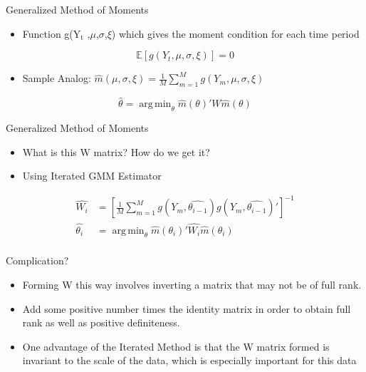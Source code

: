 \documentclass[bigger]{beamer}
\DeclareMathOperator*{\argmin}{arg\,min}
\begin{document}
\begin{frame}[label=sec-1-17]{Generalized Method of Moments}
\begin{itemize}
\item Function g(Y$_{\text{t}}$ ,$\mu$,$\sigma$,$\xi$) which gives the moment condition for
each time period
\end{itemize}
\begin{equation*}
\mathbb{E}[ g( Y_t, \mu, \sigma, \xi ) ] = 0
\end{equation*}
\begin{itemize}
\item Sample Analog: $\hat{m} ( \mu, \sigma, \xi ) = \frac{ 1 }{ M } \sum_{m=1}^M g( Y_m,
  \mu, \sigma, \xi )$
\end{itemize}

\begin{equation*}
\hat{\theta} = \argmin_{\theta} \hat{m}( \theta )' W \hat{m}( \theta )
\end{equation*}
\end{frame}

\begin{frame}[label=sec-1-18]{Generalized Method of Moments}
\begin{itemize}
\item What is this W matrix? How do we get it?
\item Using Iterated GMM Estimator
\end{itemize}

\begin{align*}
\hat{W_i} &= \left [ \frac{1}{M} \sum_{m=1}^M g(Y_m, \hat{\theta_{i-1}} ) g( Y_m, \hat{\theta_{i-1}} )' \right ]^{-1} \\
\hat{\theta_i} &= \argmin_{\theta} \hat{m}( \theta_i )' \hat{W_i} \hat{m}( \theta_i ) \\
\end{align*}
\end{frame}

\begin{frame}[label=sec-1-19]{Complication?}
\begin{itemize}
\item Forming W this way involves inverting a matrix that may not be of
full rank.
\item Add some positive number times the identity matrix in order to
obtain full rank as well as positive definiteness.
\item One advantage of the Iterated Method is that the W matrix formed is
invariant to the scale of the data, which is especially important
for this data
\end{itemize}
\end{frame}
\end{document}
